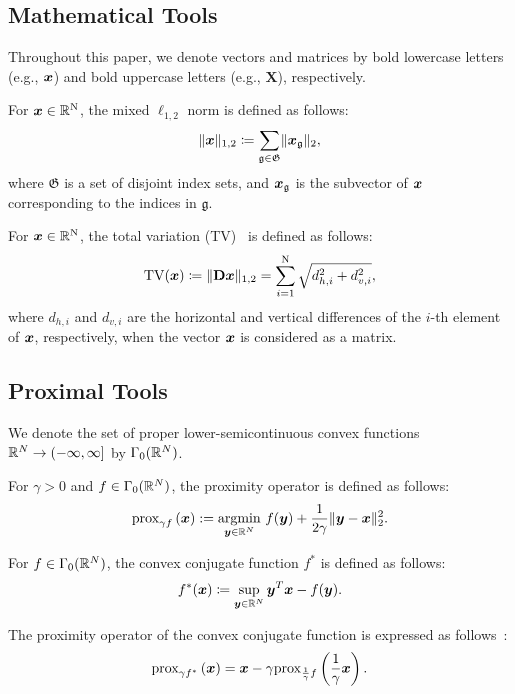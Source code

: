 \subsection{Mathematical Tools} \label{subsec:mathematical-tools}

Throughout this paper, we denote vectors and matrices by bold lowercase letters (e.g., $\bm{x}$) and bold uppercase letters (e.g., $\bm{X}$), respectively.

For $\bm{x} \in \mathbb{R}^{\mathrm{N}}$, the mixed $\ell_{1,2}$ norm is defined as follows:
\begin{equation} \label{eq:L12NormDefinitionEq} \lVert \bm{x} \rVert _{1,2} \coloneq \sum_{\mathfrak{g} \in \mathfrak{G}} \lVert \bm{x}_\mathfrak{g} \rVert _2, \end{equation}
where $\mathfrak{G}$ is a set of disjoint index sets, and $\bm{x}_{\mathfrak{g}}$ is the subvector of $\bm{x}$ corresponding to the indices in $\mathfrak{g}$.

For $\bm{x} \in \mathbb{R}^{\mathrm{N}}$, the total variation (TV)~\cite{TV} is defined as follows:
\begin{equation} \label{eq:TVDefinitionEq} \mathrm{TV}(\bm{x}) \coloneq \lVert \mathbf{D} \bm{x} \rVert _{1,2} = \sum_{i=1}^{\mathrm{N}} \sqrt{d_{h,i}^2 + d_{v,i}^2}, \end{equation}
where $d_{h,i}$ and $d_{v,i}$ are the horizontal and vertical differences of the $i$-th element of $\bm{x}$, respectively, when the vector $\bm{x}$ is considered as a matrix.



\subsection{Proximal Tools} \label{subsec:proximal-tools}

We denote the set of proper lower-semicontinuous convex functions $\mathbb{R}^N \to (- \infty, \infty]$ by $\Gamma_0(\mathbb{R}^N)$.

For $\gamma > 0$ and $f \in \Gamma_0(\mathbb{R}^N)$, the proximity operator is defined as follows:
\begin{equation} \label{eq:ProximityOperatorDefinitionEq} \mathrm{prox}_{ \gamma f }\left(\bm{x}\right) := \underset{\bm{y} \in \mathbb{R}^N}{\mathrm{argmin}} \ f(\bm{y}) + \frac{1}{2 \gamma} \lVert \bm{y} - \bm{x} \rVert _2^2. \end{equation}

For $f \in \Gamma_0(\mathbb{R}^N)$, the convex conjugate function $f^*$ is defined as follows:
\begin{equation} \label{eq:ConjugateFunctionDefinitionEq} f^*(\bm{x}) \coloneq \sup_{\bm{y} \in \mathbb{R}^N} \bm{y}^T \bm{x} - f(\bm{y}). \end{equation}

The proximity operator of the convex conjugate function is expressed as follows~\cite[Theorem 3.1 (ii)]{prox-convex-conjugate-function}:
\begin{equation} \label{eq:ProximityOperatorDefinitionWithConvexConjugateFunctionEq} \mathrm{prox}_{ \gamma f^* }\left(\bm{x}\right) = \bm{x} - \gamma \mathrm{prox}_{ \frac 1 \gamma f }\left(\frac 1 \gamma \bm{x}\right). \end{equation}

